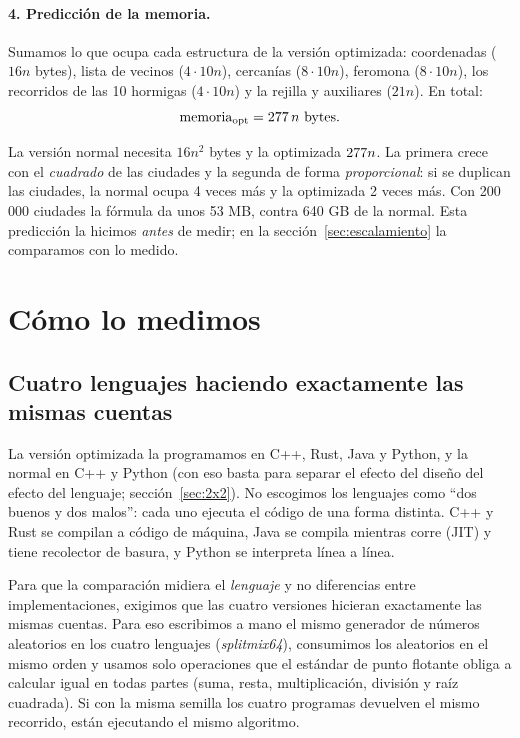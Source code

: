 \documentclass[11pt,a4paper]{article}
\begin{document}
\paragraph{4. Predicción de la memoria.} Sumamos lo que ocupa cada estructura de la
versión optimizada: coordenadas ($16n$ bytes), lista de vecinos ($4\cdot10n$),
cercanías ($8\cdot10n$), feromona ($8\cdot10n$), los recorridos de las 10 hormigas
($4\cdot10n$) y la rejilla y auxiliares ($21n$). En total:
\begin{equation}
\text{memoria}_{\text{opt}}=\BytesPorCiudad\,n\ \text{bytes}.
\label{eq:memopt}
\end{equation}

\begin{simple}
La versión normal necesita $16n^2$ bytes y la optimizada $277 n$. La
primera crece con el \emph{cuadrado} de las ciudades y la segunda de forma
\emph{proporcional}: si se duplican las ciudades, la normal ocupa 4 veces más y la
optimizada 2 veces más. Con 200\,000 ciudades la fórmula da unos 53 MB, contra 640 GB
de la normal. Esta predicción la hicimos \emph{antes} de medir; en la
sección~\ref{sec:escalamiento} la comparamos con lo medido.
\end{simple}

\section{Cómo lo medimos}

\subsection{Cuatro lenguajes haciendo exactamente las mismas cuentas}
\label{sec:verificacion}

La versión optimizada la programamos en C++, Rust, Java y Python, y la normal en C++
y Python (con eso basta para separar el efecto del diseño del efecto del lenguaje;
sección~\ref{sec:2x2}). No escogimos los lenguajes como ``dos buenos y dos malos'':
cada uno ejecuta el código de una forma distinta. C++ y Rust se compilan a código de
máquina, Java se compila mientras corre (JIT) y tiene recolector de basura, y Python
se interpreta línea a línea.

Para que la comparación midiera el \emph{lenguaje} y no diferencias entre
implementaciones, exigimos que las cuatro versiones hicieran exactamente las mismas
cuentas. Para eso escribimos a mano el mismo generador de números aleatorios en los
cuatro lenguajes (\emph{splitmix64}), consumimos los aleatorios en el mismo orden y
usamos solo operaciones que el estándar de punto flotante obliga a calcular igual en
todas partes (suma, resta, multiplicación, división y raíz cuadrada). Si con la misma
semilla los cuatro programas devuelven el mismo recorrido, están ejecutando el mismo
algoritmo.
\end{document}
